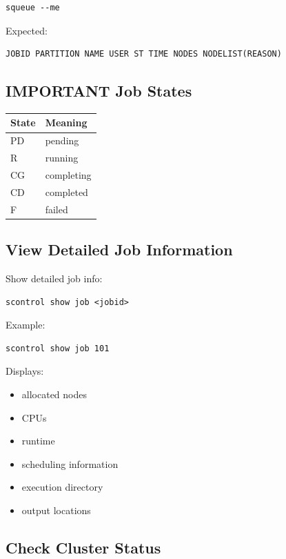 \documentclass[11pt]{article}
\begin{document}
\begin{verbatim}
squeue --me
\end{verbatim}

Expected:

\begin{verbatim}
JOBID PARTITION NAME USER ST TIME NODES NODELIST(REASON)
\end{verbatim}
\subsection{IMPORTANT Job States}
\label{sec:org1109b4b}

\begin{center}
\begin{tabular}{ll}
State & Meaning\\
\hline
PD & pending\\
R & running\\
CG & completing\\
CD & completed\\
F & failed\\
\end{tabular}
\end{center}
\subsection{View Detailed Job Information}
\label{sec:org1bd33a2}

Show detailed job info:

\begin{verbatim}
scontrol show job <jobid>
\end{verbatim}

Example:

\begin{verbatim}
scontrol show job 101
\end{verbatim}

Displays:

\begin{itemize}
\item allocated nodes
\item CPUs
\item runtime
\item scheduling information
\item execution directory
\item output locations
\end{itemize}
\subsection{Check Cluster Status}
\label{sec:orgf2c76b1}
\end{document}
